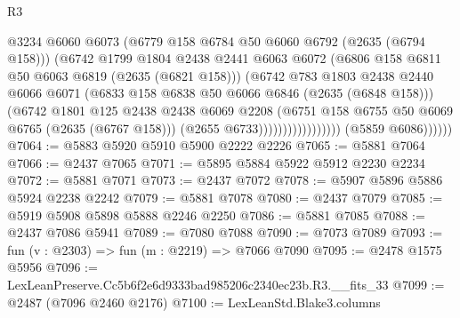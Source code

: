\begin{lexlean}{R3}
\begin{coremodule}
                                        @3234
                                        @6060
                                        @6073
                                        (@6779 @158 @6784 @50 @6060 @6792 (@2635 (@6794 @158)))
                                        (@6742
                                          @1799
                                          @1804
                                          @2438
                                          @2441
                                          @6063
                                          @6072
                                          (@6806 @158 @6811 @50 @6063 @6819 (@2635 (@6821 @158)))
                                          (@6742
                                            @783
                                            @1803
                                            @2438
                                            @2440
                                            @6066
                                            @6071
                                            (@6833 @158 @6838 @50 @6066 @6846 (@2635 (@6848 @158)))
                                            (@6742
                                              @1801
                                              @125
                                              @2438
                                              @2438
                                              @6069
                                              @2208
                                              (@6751
                                                @158
                                                @6755
                                                @50
                                                @6069
                                                @6765
                                                (@2635 (@6767 @158)))
                                              (@2655 @6733)))))))))))))))))
              (@5859 @6086))))))
@7064 := @5883 @5920 @5910 @5900 @2222 @2226
@7065 := @5881 @7064
@7066 := @2437 @7065
@7071 := @5895 @5884 @5922 @5912 @2230 @2234
@7072 := @5881 @7071
@7073 := @2437 @7072
@7078 := @5907 @5896 @5886 @5924 @2238 @2242
@7079 := @5881 @7078
@7080 := @2437 @7079
@7085 := @5919 @5908 @5898 @5888 @2246 @2250
@7086 := @5881 @7085
@7088 := @2437 @7086 @5941
@7089 := @7080 @7088
@7090 := @7073 @7089
@7093 := fun (v : @2303) => fun (m : @2219) => @7066 @7090
@7095 := @2478 @1575 @5956
@7096 := LexLeanPreserve.Cc5b6f2e6d9333bad985206c2340ec23b.R3.__fits_33
@7099 := @2487 (@7096 @2460 @2176)
@7100 := LexLeanStd.Blake3.columns

\end{coremodule}
\end{lexlean}
